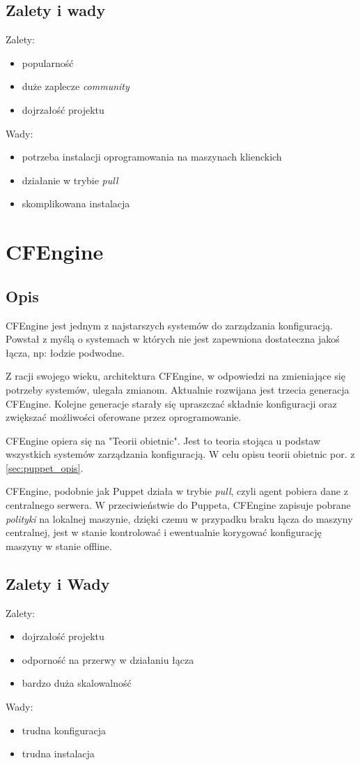 \subsection{Zalety i wady}
Zalety:
\begin{itemize}
	\item popularność
	\item duże zaplecze \textit{community}
	\item dojrzałość projektu
\end{itemize}
Wady:
\begin{itemize}
	\item potrzeba instalacji oprogramowania na maszynach klienckich
	\item działanie w trybie \textit{pull}
	\item skomplikowana instalacja
\end{itemize}

\section{CFEngine}
\subsection{Opis}
CFEngine\cite{cfengine} jest jednym z najstarszych systemów do zarządzania konfiguracją.
Powstał z myślą o systemach w których nie jest zapewniona dostateczna jakoś łącza, np: łodzie podwodne.

Z racji swojego wieku, architektura CFEngine, w odpowiedzi na zmieniające się potrzeby systemów, ulegała zmianom.
Aktualnie rozwijana jest trzecia generacja CFEngine.
Kolejne generacje starały się upraszczać składnie konfiguracji oraz zwiększać możliwości oferowane przez oprogramowanie.

CFEngine opiera się na "Teorii obietnic".
Jest to teoria stojąca u podstaw wszystkich systemów zarządzania konfiguracją. W celu opisu teorii obietnic por. z \ref{sec:puppet_opis}.

CFEngine, podobnie jak Puppet działa w trybie \textit{pull}, czyli agent pobiera dane z centralnego serwera.
W przeciwieństwie do Puppeta, CFEngine zapisuje pobrane \textit{polityki} na lokalnej maszynie, dzięki czemu w przypadku braku łącza do maszyny centralnej, jest w stanie kontrolować i ewentualnie korygować konfigurację maszyny w stanie offline.
\subsection{Zalety i Wady}
Zalety:
\begin{itemize}
	\item dojrzałość projektu
	\item odporność na przerwy w działaniu łącza
	\item bardzo duża skalowalność
\end{itemize}
Wady:
\begin{itemize}
	\item trudna konfiguracja
	\item trudna instalacja
\end{itemize}
